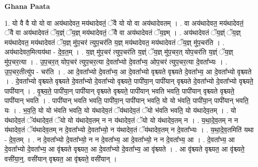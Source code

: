 \documentclass[17pt]{extarticle}
\begin{document}
\textbf{Ghana Paata } \newline

1. यो वै वै यो यो वा अय॑थादेवत॒ मय॑थादेवतं॒ ॅवै यो यो वा अय॑थादेवतम् । . वा अय॑थादेवत॒ मय॑थादेवतं॒ ॅवै वा अय॑थादेवतं ॅय॒ज्ञ्ं ॅय॒ज्ञ् मय॑थादेवतं॒ ॅवै वा अय॑थादेवतं ॅय॒ज्ञ्म् । . अय॑थादेवतं ॅय॒ज्ञ्ं ॅय॒ज्ञ् मय॑थादेवत॒ मय॑थादेवतं ॅय॒ज्ञ् मु॑प॒चर॑ त्युप॒चर॑ति य॒ज्ञ् मय॑थादेवत॒ मय॑थादेवतं ॅय॒ज्ञ् मु॑प॒चर॑ति । . अय॑थादेवत॒मित्यय॑था - दे॒व॒त॒म् । . य॒ज्ञ् मु॑प॒चर॑ त्युप॒चर॑ति य॒ज्ञ्ं ॅय॒ज्ञ् मु॑प॒चर॒त् योप॒चर॑ति य॒ज्ञ्ं ॅय॒ज्ञ् मु॑प॒चर॒त्या । . उ॒प॒चर॒त् योप॒चर॑ त्युप॒चर॒त्या दे॒वता᳚भ्यो दे॒वता᳚भ्य॒ ओप॒चर॑ त्युप॒चर॒त्या दे॒वता᳚भ्यः । . उ॒प॒चर॒तीत्यु॑प - चर॑ति । . आ दे॒वता᳚भ्यो दे॒वता᳚भ्य॒ आ दे॒वता᳚भ्यो वृश्च्यते वृश्च्यते दे॒वता᳚भ्य॒ आ दे॒वता᳚भ्यो वृश्च्यते । . दे॒वता᳚भ्यो वृश्च्यते वृश्च्यते दे॒वता᳚भ्यो दे॒वता᳚भ्यो वृश्च्यते॒ पापी॑या॒न् पापी॑यान् वृश्च्यते दे॒वता᳚भ्यो दे॒वता᳚भ्यो वृश्च्यते॒ पापी॑यान् । . वृ॒श्च्य॒ते॒ पापी॑या॒न् पापी॑यान् वृश्च्यते वृश्च्यते॒ पापी॑यान् भवति भवति॒ पापी॑यान् वृश्च्यते वृश्च्यते॒ पापी॑यान् भवति । . पापी॑यान् भवति भवति॒ पापी॑या॒न् पापी॑यान् भवति॒ यो यो भ॑वति॒ पापी॑या॒न् पापी॑यान् भवति॒ यः । . भ॒व॒ति॒ यो यो भ॑वति भवति॒ यो य॑थादेव॒तं ॅय॑थादेव॒तं ॅयो भ॑वति भवति॒ यो य॑थादेव॒तम् । . यो य॑थादेव॒तं ॅय॑थादेव॒तं ॅयो यो य॑थादेव॒तम् न न य॑थादेव॒तं ॅयो यो य॑थादेव॒तम् न । . य॒था॒दे॒व॒तम् न न य॑थादेव॒तं ॅय॑थादेव॒तम् न दे॒वता᳚भ्यो दे॒वता᳚भ्यो॒ न य॑थादेव॒तं ॅय॑थादेव॒तम् न दे॒वता᳚भ्यः । . य॒था॒दे॒व॒तमिति॑ यथा - दे॒व॒तम् । . न दे॒वता᳚भ्यो दे॒वता᳚भ्यो॒ न न दे॒वता᳚भ्य॒ आ दे॒वता᳚भ्यो॒ न न दे॒वता᳚भ्य॒ आ । . दे॒वता᳚भ्य॒ आ दे॒वता᳚भ्यो दे॒वता᳚भ्य॒ आ वृ॑श्च्यते वृश्च्यत॒ आ दे॒वता᳚भ्यो दे॒वता᳚भ्य॒ आ वृ॑श्च्यते । . आ वृ॑श्च्यते वृश्च्यत॒ आ वृ॑श्च्यते॒ वसी॑या॒न्॒. वसी॑यान् वृश्च्यत॒ आ वृ॑श्च्यते॒ वसी॑यान् । \newline
\end{document}
